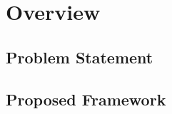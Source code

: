 \section{Overview} \label{sec:overview}

\subsection{Problem Statement} \label{sec:problem}


\subsection{Proposed Framework} \label{sec:framework}

